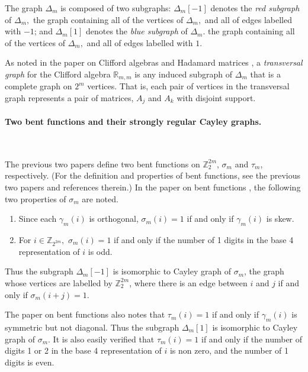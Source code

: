 \documentclass[12pt,a4paper]{article}
\newcommand{\mb}[1]{\mathbb{#1}}
\newcommand{\R}{\mb{R}}
\newcommand{\Z}{\mb{Z}}
\begin{document}
The graph $\varDelta_m$ is composed
of two subgraphs:
$\varDelta_m[-1]$ denotes the \emph{red subgraph} of $\varDelta_m,$
the graph containing all of the vertices of $\varDelta_m,$ and all of edges labelled with $-1$;
and $\varDelta_m[1]$ denotes the \emph{blue subgraph} of $\varDelta_m.$
the graph containing all of the vertices of $\varDelta_m,$ and all of edges labelled with $1$.

As noted in the paper on Clifford algebras and Hadamard matrices \cite{Leo14Constructions},
a \emph{transversal graph} for the Clifford algebra $\R_{m,m}$
is any induced subgraph of $\varDelta_m$ that is a complete graph on $2^m$ vertices.
That is, each pair of vertices in the transversal graph represents a pair of matrices,
$A_j$ and $A_k$ with disjoint support.
\paragraph*{Two bent functions and their strongly regular Cayley graphs.}
\label{sec-Bent}

~

The previous two papers \cite{Leo14Constructions,Leo15Bent} 
define two bent functions  on $\Z_2^{2 m}$, $\sigma_m$ and $\tau_m$, respectively.
(For the definition and properties of bent functions, see the previous two papers \cite{Leo14Constructions,Leo15Bent}
and references therein.)
\newpage
In the paper on bent functions \cite{Leo15Bent}, the following two properties of $\sigma_m$ are noted.
\begin{enumerate}
 \item 
Since each $\gamma_m(i)$ is orthogonal, $\sigma_m(i) = 1$ if and only if $\gamma_m(i)$ is skew.
 \item 
For $i \in \Z_{2^{2m}},$ $\sigma_m(i) = 1$ if and only if the number of
1 digits in  the base 4 representation of $i$ is odd.
\end{enumerate}
Thus the subgraph $\varDelta_m[-1]$ is isomorphic to Cayley graph of $\sigma_m$,
the graph whose vertices are labelled by $\Z_2^{2 m}$,
where there is an edge between $i$ and $j$ if and only if $\sigma_m(i+j)=1$.

The paper on bent functions \cite{Leo15Bent} also notes that 
$\tau_m(i) = 1$ if and only if $\gamma_m(i)$ is symmetric but not diagonal.
Thus the subgraph $\varDelta_m[1]$ is isomorphic to Cayley graph of $\sigma_m$.
It is also easily verified that $\tau_m(i) = 1$ if and only if the number of digits 1 or 2 in the base 4
representation of $i$ is non zero, and the number of 1 digits is even.
\end{document}

